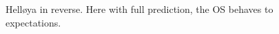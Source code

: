 \begin{figure}[ht]
\begin{subfigure}[b]{0.494\textwidth}
        \subcaption{}
    \end{subfigure}
    \hfill
    \caption{Helløya in reverse. Here with full prediction, the \gls{OS} behaves to expectations.}

\end{figure}


